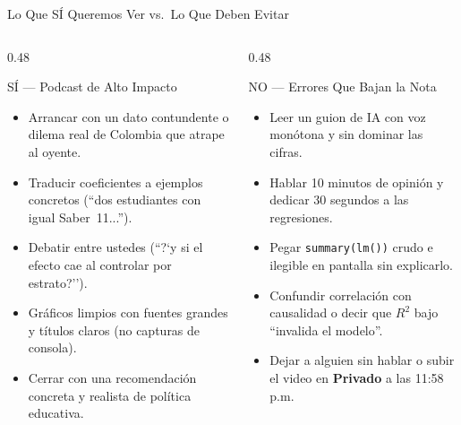 \documentclass[aspectratio=169, 10pt]{beamer}
\begin{document}
\begin{frame}{Lo Que S\'I Queremos Ver vs.\ Lo Que Deben Evitar}
  \begin{columns}[T]
    \begin{column}{0.48\textwidth}
      \begin{exampleblock}{S\'I --- Podcast de Alto Impacto}
        \small
        \begin{itemize}\setlength{\itemsep}{3.5pt}
          \item Arrancar con un dato contundente o dilema real de Colombia que atrape al oyente.
          \item Traducir coeficientes a ejemplos concretos (``dos estudiantes con igual Saber~11...'').
          \item Debatir entre ustedes (``?`y si el efecto cae al controlar por estrato?'').
          \item Gr\'aficos limpios con fuentes grandes y t\'itulos claros (no capturas de consola).
          \item Cerrar con una recomendaci\'on concreta y realista de pol\'itica educativa.
        \end{itemize}
      \end{exampleblock}
    \end{column}
    \begin{column}{0.48\textwidth}
      \begin{alertblock}{NO --- Errores Que Bajan la Nota}
        \small
        \begin{itemize}\setlength{\itemsep}{3.5pt}
          \item Leer un guion de IA con voz mon\'otona y sin dominar las cifras.
          \item Hablar 10 minutos de opini\'on y dedicar 30 segundos a las regresiones.
          \item Pegar \texttt{summary(lm())} crudo e ilegible en pantalla sin explicarlo.
          \item Confundir correlaci\'on con causalidad o decir que $R^2$ bajo ``invalida el modelo''.
          \item Dejar a alguien sin hablar o subir el video en \textbf{Privado} a las 11:58 p.m.
        \end{itemize}
      \end{alertblock}
    \end{column}
  \end{columns}
\end{frame}
\end{document}
